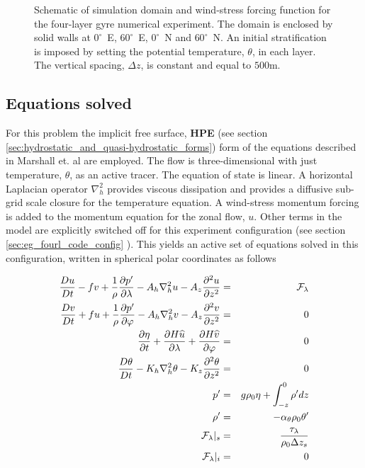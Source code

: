 \begin{figure}
\centerline{
}
\caption{Schematic of simulation domain and wind-stress forcing function 
for the four-layer gyre numerical experiment. The domain is enclosed by solid
walls at $0^{\circ}$~E, $60^{\circ}$~E, $0^{\circ}$~N and $60^{\circ}$~N.
An initial stratification is 
imposed by setting the potential temperature, $\theta$, in each layer.
The vertical spacing, $\Delta z$, is constant and equal to $500$m.
}
\label{fig:eg-fourlayer-simulation_config}
\end{figure}

\subsection{Equations solved}
For this problem
the implicit free surface, {\bf HPE} (see section \ref{sec:hydrostatic_and_quasi-hydrostatic_forms}) form of the 
equations described in Marshall et. al \cite{marshall:97a} are
employed. The flow is three-dimensional with just temperature, $\theta$, as 
an active tracer.  The equation of state is linear.
A horizontal Laplacian operator $\nabla_{h}^2$ provides viscous
dissipation and provides a diffusive sub-grid scale closure for the 
temperature equation. A wind-stress momentum forcing is added to the momentum 
equation for the zonal flow, $u$. Other terms in the model
are explicitly switched off for this experiment configuration (see section
\ref{sec:eg_fourl_code_config} ). This yields an active set of equations
solved in this configuration, written in spherical polar coordinates as 
follows

\begin{eqnarray}
\label{eq:eg-fourlayer-model_equations}
\frac{Du}{Dt} - fv + 
  \frac{1}{\rho}\frac{\partial p^{\prime}}{\partial \lambda} - 
  A_{h}\nabla_{h}^2u - A_{z}\frac{\partial^{2}u}{\partial z^{2}} 
& = &
\cal{F}_{\lambda}
\\
\frac{Dv}{Dt} + fu + 
  \frac{1}{\rho}\frac{\partial p^{\prime}}{\partial \varphi} - 
  A_{h}\nabla_{h}^2v - A_{z}\frac{\partial^{2}v}{\partial z^{2}} 
& = &
0
\\
\frac{\partial \eta}{\partial t} + \frac{\partial H \widehat{u}}{\partial \lambda} +
\frac{\partial H \widehat{v}}{\partial \varphi}
&=&
0
\label{eq:fourl_example_continuity}
\\
\frac{D\theta}{Dt} -
 K_{h}\nabla_{h}^2\theta  - K_{z}\frac{\partial^{2}\theta}{\partial z^{2}} 
& = &
0
\label{eq:eg_fourl_theta}
\\
p^{\prime} & = &
g\rho_{0} \eta + \int^{0}_{-z}\rho^{\prime} dz
\\
\rho^{\prime} & = &- \alpha_{\theta}\rho_{0}\theta^{\prime}
\\
{\cal F}_{\lambda} |_{s} & = & \frac{\tau_{\lambda}}{\rho_{0}\Delta z_{s}}
\\
{\cal F}_{\lambda} |_{i} & = & 0
\end{eqnarray}

